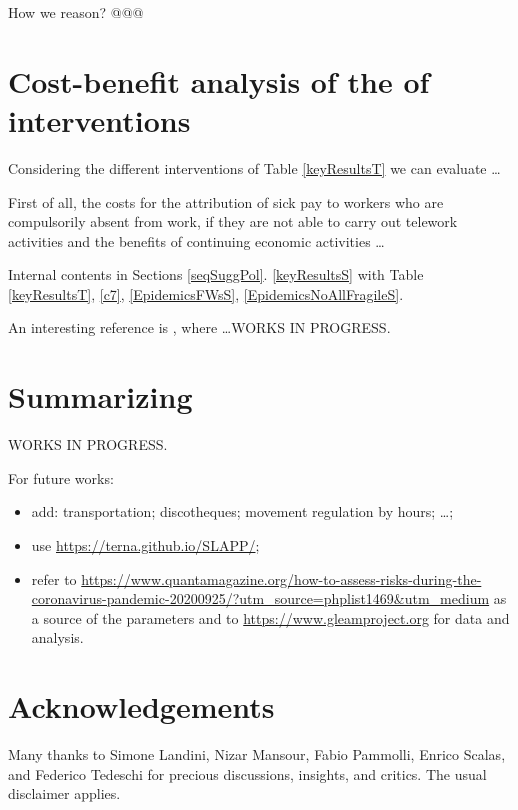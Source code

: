 \documentclass[graybox]{svmult}
\begin{document}
How we reason?
@@@


\section{Cost-benefit analysis of the of interventions}
\label{CBanalysis}

Considering  the different interventions of Table \ref{keyResultsT} we can evaluate \ldots

First of all, the costs for the attribution of sick pay to workers who are compulsorily absent from work, if they are not able to carry out telework activities and the benefits of continuing economic activities \ldots

Internal contents in Sections \ref{seqSuggPol}. 
\ref{keyResultsS} with Table \ref{keyResultsT}, \ref{c7}, 
\ref{EpidemicsFWsS}, 
\ref{EpidemicsNoAllFragileS}.

An interesting reference is \cite{doi:10.1111/ijcp.13674}, where \ldots WORKS IN PROGRESS.

\section{Summarizing}

WORKS IN PROGRESS.

For future works:
\begin{itemize}

\item add: transportation; discotheques; movement regulation by hours; \ldots;

\item use \url{https://terna.github.io/SLAPP/};

\item refer to \url{https://www.quantamagazine.org/how-to-assess-risks-during-the-coronavirus-pandemic-20200925/?utm_source=phplist1469&utm_medium} as a source of the parameters and to \url{https://www.gleamproject.org} for data and analysis.

\end{itemize}

\section*{Acknowledgements}

Many thanks to Simone Landini, Nizar Mansour, Fabio Pammolli, Enrico Scalas, and Federico Tedeschi for precious discussions, insights, and critics. The usual disclaimer applies.
\end{document}
